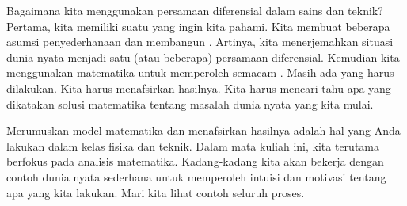 \begin{center}
\end{center}
\noindent
Bagaimana kita menggunakan persamaan diferensial dalam sains dan teknik?
Pertama, kita memiliki suatu \emph{} yang ingin
kita pahami.
Kita membuat beberapa asumsi penyederhanaan dan membangun
\emph{}.
Artinya, kita menerjemahkan situasi dunia nyata menjadi
satu (atau beberapa) persamaan diferensial.
Kemudian kita menggunakan matematika untuk memperoleh semacam
\emph{}.
Masih ada yang harus dilakukan. Kita harus menafsirkan hasilnya.
Kita harus mencari tahu apa yang dikatakan solusi matematika tentang masalah dunia nyata
yang kita mulai.

Merumuskan model matematika dan menafsirkan
hasilnya adalah hal yang Anda lakukan dalam kelas fisika dan teknik.
Dalam mata kuliah ini, kita terutama berfokus pada analisis matematika.
Kadang-kadang kita akan
bekerja dengan contoh dunia nyata sederhana
untuk memperoleh intuisi dan
motivasi tentang apa yang kita lakukan.
Mari kita lihat
contoh seluruh proses.


